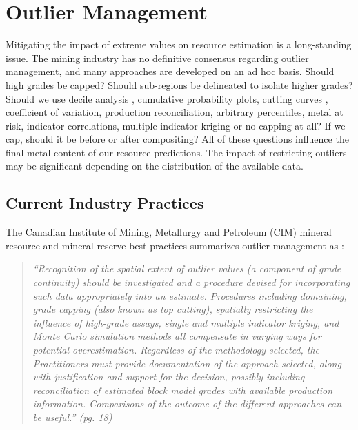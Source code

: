 
\chapter{Outlier Management}
\label{ch:predict}

Mitigating the impact of extreme values on resource estimation is a long-standing issue. The mining industry has no definitive consensus regarding outlier management, and many approaches are developed on an ad hoc basis. Should high grades be capped? Should sub-regions be delineated to isolate higher grades? Should we use decile analysis \citep{parrish1997geologist}, cumulative probability plots, cutting curves \citep{roscoe1996cutting}, coefficient of variation, production reconciliation, arbitrary percentiles, metal at risk, indicator correlations, multiple indicator kriging or no capping at all? If we cap, should it be before or after compositing? All of these questions influence the final metal content of our resource predictions. The impact of restricting outliers may be significant depending on the distribution of the available data.

\section{Current Industry Practices}
\label{sec:industry}

The Canadian Institute of Mining, Metallurgy and Petroleum (CIM) mineral resource and mineral reserve best practices summarizes outlier management as \citep{cim2019}:

\blockquote{\textit{``Recognition of the spatial extent of outlier values (a component of grade continuity) should be investigated and a procedure devised for incorporating such data appropriately into an estimate. Procedures including domaining, grade capping (also known as top cutting), spatially restricting the influence of high-grade assays, single and multiple indicator kriging, and Monte Carlo simulation methods all compensate in varying ways for potential overestimation. Regardless of the methodology selected, the Practitioners must provide documentation of the approach selected, along with justification and support for the decision, possibly including reconciliation of estimated block model grades with available production information. Comparisons of the outcome of the different approaches can be useful.'' (pg. 18)}}

